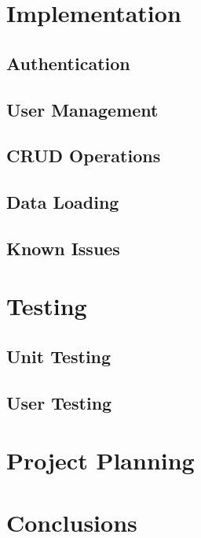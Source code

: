 \documentclass[12pt, a4paper,twoside]{report}
\theoremstyle{plain} %
\theoremstyle{definition} %
\numberwithin{equation}{chapter}
\begin{document}

\chapter{Implementation}\label{ch:implementation}

\section{Authentication}\label{sec:authentication}

\section{User Management}\label{sec:usermanagement}

\section{CRUD Operations}\label{sec:crudoperations}

\section{Data Loading}\label{sec:dataloading}

\section{Known Issues}\label{sec:knownissues}


\chapter{Testing}\label{ch:testing}

\section{Unit Testing}\label{sec:unittesting}

\section{User Testing}\label{sec:usertesting}


\chapter{Project Planning}\label{ch:projectplanning}


\chapter{Conclusions}\label{ch:conclusion}



\end{document}
